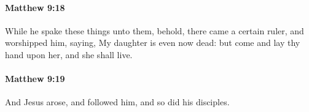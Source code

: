 		\paragraph{Matthew 9:18} %
			\label{MATTHEW-9-18}

			While he spake these things unto them, behold, there came a certain ruler, and worshipped him, saying, My daughter is even now dead: but come and lay thy hand upon her, and she shall live.

			\begin{framed}
			\scriptsize
				\begin{compactdesc}
					\item[SBLG] 
				\end{compactdesc}
			\end{framed}

		\paragraph{Matthew 9:19} %
			\label{MATTHEW-9-19}

			And Jesus arose, and followed him, and so did his disciples.

